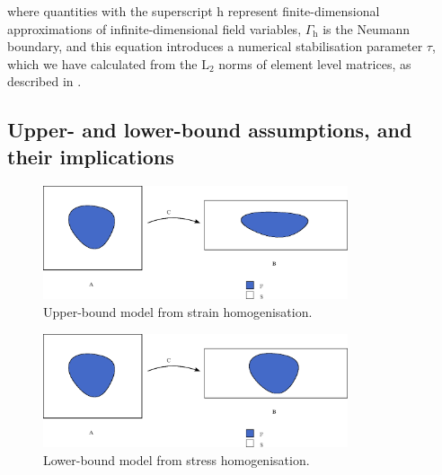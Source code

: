 \noindent where quantities with the superscript $\mathrm{h}$ represent
finite-di\-men\-sion\-al approximations of infinite-dimensional field
variables, $\Gamma_{\mathrm{h}}$ is the Neumann boundary, and 
this equation introduces a numerical stabilisation parameter $\tau$,
which we have calculated from the $\mathrm{L}_{2}$ norms of element
level matrices, as described in
\cite{tezduyarsupg}.

\subsection{Upper- and lower-bound assumptions, and their implications}
\label{upper-and-lower-bounds}

\begin{figure}[ht]
  \centering
  \includegraphics[width=0.8\textwidth]
                  {images/elucidation/homogeneous-deformation}
  \caption{Upper-bound model from strain homogenisation.}
  \label{upper-bound-model}
\end{figure}

\begin{figure}[ht]
  \centering
  \includegraphics[width=0.8\textwidth]
                  {images/elucidation/homogeneous-stress}
  \caption{Lower-bound model from stress homogenisation.}
  \label{lower-bound-model}
\end{figure}

%

